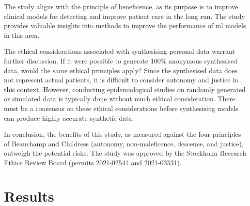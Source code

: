 \documentclass[12pt, a4paper]{article}
\begin{document}
The study aligns with the principle of beneficence, as its purpose is to improve clinical models for detecting  and improve patient care in the long run. The study provides valuable insights into methods to improve the performance of \acrshort{ml} models in this area.

The ethical considerations associated with synthesising personal data warrant further discussion. If it were possible to generate 100\% anonymous synthesised data, would the same ethical principles apply? Since the synthesised data does not represent actual patients, it is difficult to consider autonomy and justice in this context. However, conducting epidemiological studies on randomly generated or simulated data is typically done without much ethical consideration. There must be a consensus on these ethical considerations before synthesising models can produce highly accurate synthetic data.

In conclusion, the benefits of this study, as measured against the four principles of Beauchamp and Childress (autonomy, non-maleficence, descence, and justice), outweigh the potential risks. The study was approved by the Stockholm Research Ethics Review Board (permits 2021-02541 and 2021-03531).

\section{Results}
\end{document}

